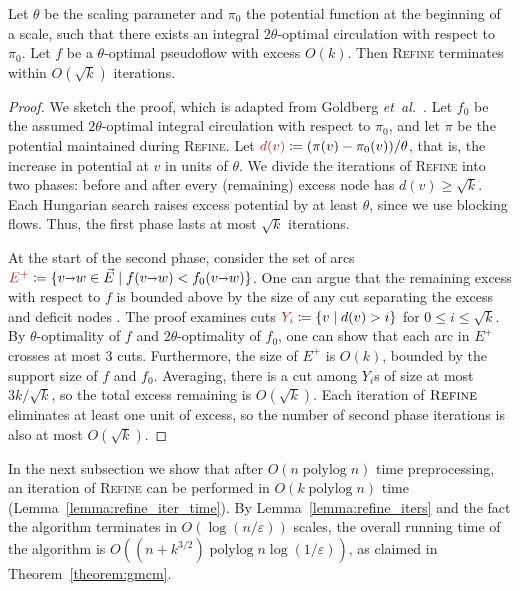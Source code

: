 \documentclass[11pt,twoside]{article}
\def\etal{\emph{et~al.}}
\def\etal{\textit{et~al.}}
\def\polylog{\mathop{\mathrm{polylog}}}
\def\eps{\varepsilon}
\def\arcto{\mathord\shortrightarrow}
\def\arc#1#2{#1\arcto#2}
\theoremstyle{plain}
\numberwithin{figure}{section}
\def\EMPH#1{\textcolor{BrickRed}{{\emph{#1}}}}
\begin{document}
\begin{lemma}
\label{lemma:refine_iters}
Let $\theta$ be the scaling parameter and $\pi_0$ the potential function at the
beginning of a scale, such that there exists an integral $2\theta$-optimal
circulation with respect to $\pi_0$.
Let $f$ be a $\theta$-optimal pseudoflow with excess $O(k)$.
Then \textsc{Refine} terminates within $O(\sqrt{k})$ iterations.
\end{lemma}

\begin{proof}
We sketch the proof, which is adapted from Goldberg \etal~\cite{GHKT17}.
Let $f_0$ be the assumed $2\theta$-optimal integral circulation with respect to $\pi_0$,
and let $\pi$ be the potential maintained during \textsc{Refine}.
Let $\EMPH{$d(v)$} \coloneqq (\pi(v) - \pi_0(v))/\theta$, that is, the increase in potential
at $v$ in units of $\theta$.
We divide the iterations of \textsc{Refine} into two phases: before and after
every (remaining) excess node has $d(v) \geq \sqrt{k}$.
Each Hungarian search raises excess potential by at least $\theta$,
since we use blocking flows.
Thus, the first phase lasts at most $\sqrt{k}$ iterations.

At the start of the second phase, consider the set of arcs
$\EMPH{$E^+$} \coloneqq \{\arc vw \in \vec{E} \mid f(\arc vw) < f_0(\arc vw)\}$.
One can argue that the remaining excess with respect to $f$ is bounded above by
the size of any cut separating the excess and deficit nodes \cite[Lemma~4]{GHKT17}.
The proof examines cuts $\EMPH{$Y_i$} \coloneqq \{v \mid d(v) > i\}$ for $0 \leq i \leq \sqrt{k}$.
By $\theta$-optimality of $f$ and $2\theta$-optimality of $f_0$, one can show
that each arc in $E^+$ crosses at most 3 cuts.
Furthermore, the size of $E^+$ is $O(k)$, bounded by the support size of $f$ and $f_0$.
Averaging, there is a cut among $Y_i$s of size at most $3k/\sqrt{k}$,
so the total excess remaining is $O(\sqrt{k})$.
Each iteration of $\textsc{Refine}$ eliminates at least one unit of excess,
so the number of second phase iterations is also at most $O(\sqrt{k})$.
\end{proof}

In the next subsection we show that after $O(n\polylog n)$ time preprocessing,
an iteration of \textsc{Refine} can be performed in $O(k\polylog n)$ time
(Lemma~\ref{lemma:refine_iter_time}).
By Lemma~\ref{lemma:refine_iters} and the fact the algorithm terminates in
$O(\log(n/\eps))$ scales, the overall running time of the algorithm is
$O((n + k^{3/2})\polylog n \log(1/\eps))$, as claimed in Theorem~\ref{theorem:gmcm}.
\end{document}
